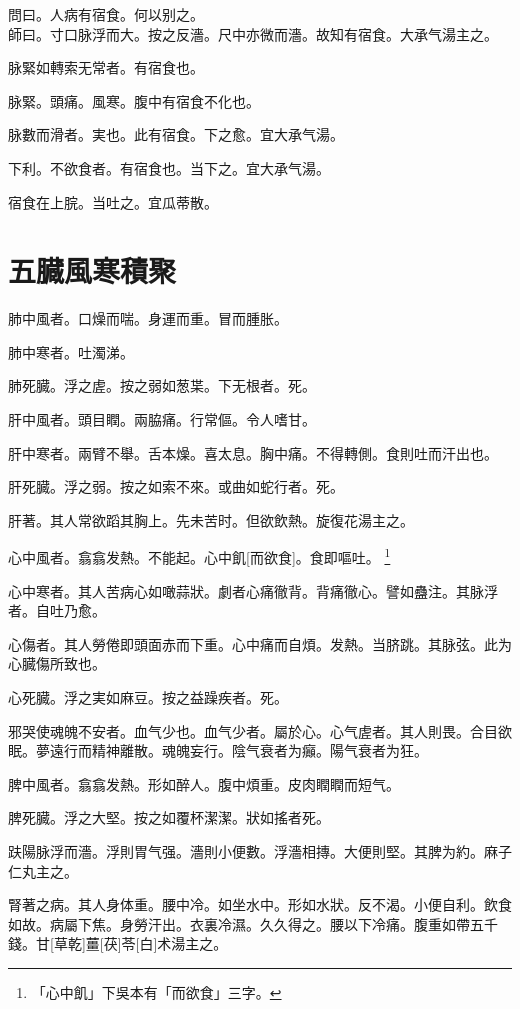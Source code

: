 \documentclass[12pt,twoside,UTF8,b5paper]{ctexbook}
\begin{document}
問曰。人病有宿食。何以别之。\\
師曰。寸口脉浮而大。按之反濇。尺中亦微而濇。故知有宿食。大承气湯主之。

脉緊如轉索无常者。有宿食也。

脉緊。頭痛。風寒。腹中有宿食不化也。

脉數而滑者。実也。此有宿食。下之愈。宜大承气湯。

下利。不欲食者。有宿食也。当下之。宜大承气湯。

宿食在上脘。当吐之。宜瓜蒂散。

\chapter{五臓風寒積聚}

肺中風者。口燥而喘。身運而重。冒而腫胀。

肺中寒者。吐濁涕。

肺死臓。浮之虗。按之弱如葱枼。下无根者。死。

肝中風者。頭目瞤。兩脇痛。行常傴。令人嗜甘。

肝中寒者。兩臂不舉。舌本燥。喜太息。胸中痛。不得轉側。食則吐而汗出也。

肝死臓。浮之弱。按之如索不來。或曲如蛇行者。死。

肝著。其人常欲蹈其胸上。先未苦时。但欲飲熱。旋復花湯主之。

心中風者。翕翕发熱。不能起。心中飢[而欲食]。食即嘔吐。
	\footnote{「心中飢」下吳本有「而欲食」三字。}

心中寒者。其人苦病心如噉蒜狀。劇者心痛徹背。背痛徹心。譬如蠱注。其脉浮者。自吐乃愈。

心傷者。其人勞倦即頭面赤而下重。心中痛而自煩。发熱。当脐跳。其脉弦。此为心臓傷所致也。

心死臓。浮之実如麻豆。按之益躁疾者。死。

邪哭使魂魄不安者。血气少也。血气少者。屬於心。心气虗者。其人則畏。合目欲眠。夢遠行而精神離散。魂魄妄行。陰气衰者为癲。陽气衰者为狂。

脾中風者。翕翕发熱。形如醉人。腹中煩重。皮肉瞤瞤而短气。

脾死臓。浮之大堅。按之如覆杯潔潔。狀如搖者死。

趺陽脉浮而濇。浮則胃气强。濇則小便數。浮濇相摶。大便則堅。其脾为約。麻子仁丸主之。

腎著之病。其人身体重。腰中冷。如坐水中。形如水狀。反不渴。小便自利。飲食如故。病屬下焦。身勞汗出。衣裏冷濕。久久得之。腰以下冷痛。腹重如帶五千錢。甘[草乾]薑[茯]苓[白]术湯主之。
\end{document}
